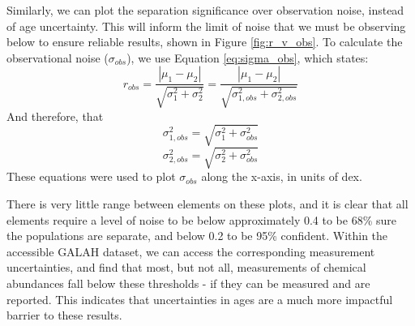 \documentclass[fleqn,usenatbib]{mnras}
\begin{document}
Similarly, we can plot the separation significance over observation noise, instead of age uncertainty. This will inform the limit of noise that we must be observing below to ensure reliable results, shown in Figure \ref{fig:r_v_obs}. 
To calculate the observational noise ($\sigma_{obs}$), we use Equation \ref{eq:sigma_obs}, which states:
\begin{equation} \label{eq:sigma_obs}
r_{obs} = \frac{|\mu_1 - \mu_2|}{\sqrt{\sigma_1^2 + \sigma_2^2}} = 
\frac{|\mu_1 - \mu_2|}{\sqrt{\sigma_{1,obs}^2 + \sigma_{2,obs}^2}}
\end{equation}
And therefore, that
\begin{equation} \label{eq:sigma_obs_2}
\sigma_{1,obs}^2 = \sqrt{\sigma_1^2+\sigma_{obs}^2} \end{equation}\begin{equation} 
\sigma_{2,obs}^2 = \sqrt{\sigma_2^2+\sigma_{obs}^2}\end{equation}
These equations were used to plot $\sigma_{obs}$ along the x-axis, in units of dex. 

 There is very little range between elements on these plots, and it is clear that all elements require a level of noise to be below approximately 0.4 to be 68\% sure the populations are separate, and below 0.2 to be 95\% confident. Within the accessible GALAH dataset, we can access the corresponding measurement uncertainties, and find that most, but not all, measurements of chemical abundances fall below these thresholds - if they can be measured and are reported. This indicates that uncertainties in ages are a much more impactful barrier to these results. 
  




\end{document}
